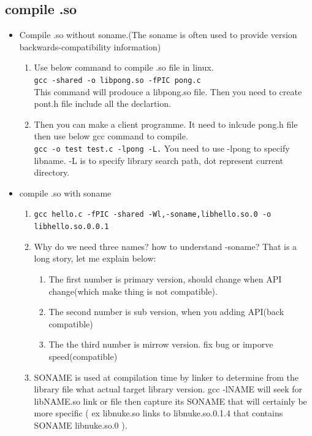 \documentclass[a4paper,11pt,twoside]{book}
\begin{document}
\subsection{compile .so}
  \begin{itemize}

		  \item Compile .so without soname.(The soname is often used to provide version backwards-compatibility information)

	\begin{enumerate}
	\item Use below command to compile .so file in linux. \\
   \verb=gcc -shared -o libpong.so -fPIC pong.c= \\
   This command will prodouce a libpong.so file. Then you need to create pont.h file include all the declartion. 
   
   \item Then you can make a client programme. It need to inlcude pong.h file then use below gcc command to compile. \\
	\verb=gcc -o test test.c -lpong -L.=
	You need to use -lpong to specify libname. -L is to specify library search path, dot represent current directory.        
	\end{enumerate}

       \item compile .so with soname 
       \begin{enumerate}
		\item \verb=gcc hello.c -fPIC -shared -Wl,-soname,libhello.so.0 -o libhello.so.0.0.1= 
		\item Why do we need three names? how to understand -soname? That is a long story, let me explain below:
				\begin{enumerate}
						\item The first number is primary version, should change when API change(which make thing is not compatible).
						\item The second number is sub version, when you adding API(back compatible)
						\item The the third number is mirrow version. fix bug or imporve speed(compatible)
				\end{enumerate}
		 
				\item SONAME is used at compilation time by linker to determine from the library file what actual target library version. gcc -lNAME will seek for libNAME.so link or file then capture its SONAME that will certainly be more specific ( ex libnuke.so links to libnuke.so.0.1.4 that contains SONAME libnuke.so.0 ).


\end{enumerate}
\end{itemize}
\end{document}
